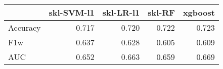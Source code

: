 \begin{tabular}{lrrrr}
\toprule
{} &  skl-SVM-l1 &  skl-LR-l1 &  skl-RF &  xgboost \\
\midrule
Accuracy &       0.717 &      0.720 &   0.722 &    0.723 \\
F1w      &       0.637 &      0.628 &   0.605 &    0.609 \\
AUC      &       0.652 &      0.663 &   0.659 &    0.669 \\
\bottomrule
\end{tabular}
